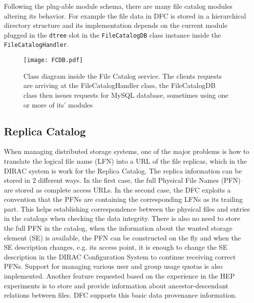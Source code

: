 

Following the plug-able module schema, there are many file catalog modules altering its behavior. For example the 
file data in DFC is stored in a hierarchical directory structure and its implementation depends on the current
module plugged in the \texttt{dtree} slot in the \texttt{FileCatalogDB} class instance inside the 
\texttt{FileCatalogHandler}. 

\begin{figure}[h]
	\centering
	\texttt{[image: FCDB.pdf]}
	\caption{Class diagram inside the File Catalog service. The clients requests are arriving at the 
	FileCatalogHandler class, the FileCatalogDB class then issues requests for MySQL database, sometimes using one
	or more of its' modules}
	\label{fig:FCClasses}
\end{figure}



\subsection{Replica Catalog}

When managing distributed storage systems, one of the major problems is how to translate the logical 
file name (LFN) into a URL of the file replicas, which in the DIRAC system is work for the Replica
Catalog. The replica information can be stored in 2 different ways. In the first case, the full Physical File
Names (PFN) are stored as complete access URLs. In the second case, the DFC exploits a convention
that the PFNs are containing the corresponding LFNs as its trailing part. %
This helps establishing correspondence between the physical files and entries in the catalogs when checking 
the data integrity. There is also no need to store the full PFN in the catalog, when
the information about the wanted storage element (SE) is available, the PFN can be constructed on the fly and when 
the SE description changes, e.g. its access point, it is enough to change the SE description in the DIRAC 
Configuration System to continue receiving correct PFNs. Support for managing various user and group usage 
quotas is also implemented. Another feature requested based on the experience in 
the HEP experiments is to store and provide information about ancestor-descendant relations between files. 
DFC supports this basic data provenance information. 


